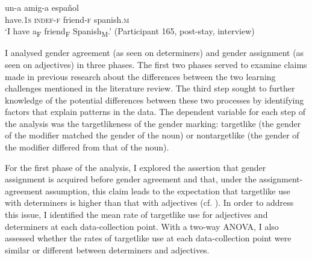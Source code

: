 \documentclass[output=paper,colorlinks,citecolor=brown,modfonts,nonflat]{../langscibook}
\begin{document}
\ea%
    \label{ex:gudmestad:2}
      {un-a}  {amig-a}  {español}  \\
        have.1\textsc{s} \textsc{indef}-\textsc{f} friend-\textsc{f} spanish.\textsc{m}\\
\glt ‘I have a\textsubscript{F} friend\textsubscript{F} Spanish\textsubscript{M}.’ (Participant 165, post-stay, interview)
\z



I analysed gender agreement (as seen on determiners) and gender assignment (as seen on adjectives) in three phases. The first two phases served to examine claims made in previous research about the differences between the two learning challenges mentioned in the literature review. The third step sought to further knowledge of the potential differences between these two processes by identifying factors that explain patterns in the data. The dependent variable for each step of the analysis was the targetlikeness of the gender marking: targetlike (the gender of the modifier matched the gender of the noun) or nontargetlike (the gender of the modifier differed from that of the noun).



For the first phase of the analysis, I explored the assertion that gender assignment is acquired before gender agreement and that, under the assignment-agreement assumption, this claim leads to the expectation that targetlike use with determiners is higher than that with adjectives (cf. \citealt{Alarcón2010}). In order to address this issue, I identified the mean rate of targetlike use for adjectives and determiners at each data-collection point. With a two-way ANOVA, I also assessed whether the rates of targetlike use at each data-collection point were similar or different between determiners and adjectives.
\end{document}
